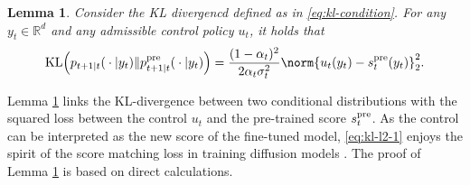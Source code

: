 \documentclass{article}
\newtheorem{Lemma}[Theorem]{Lemma}
\newcommand{\R}{\mathbb{R}}
\begin{document}
%
  \begin{Lemma} \label{lemma:kl-l2} 
  Consider the KL divergencd defined as in \eqref{eq:kl-condition}.
  For any $y_t \in \R^d$ and any admissible control policy $u_t$, it holds that
      \begin{align}\label{eq:kl-l2-1}
        {\rm KL}\Big(p_{t+1\vert t}({}\cdot{}\vert y_t) \|p_{t+1\vert t}^{\rm pre}({}\cdot{}\vert y_t)\Big) = \frac{(1 - \alpha_{t})^{2}}{2\alpha_{t}\sigma_{t}^{2}}\norm{u_{t}(y_t) - s^{\rm pre}_{t}(y_{t})}_{2}^{2}.
    \end{align}
  \end{Lemma}
    
  Lemma \ref{lemma:kl-l2} links the KL-divergence between two conditional distributions with the squared loss between the control $u_t$ and the pre-trained score $s_t^{\rm pre}$. As the control can be interpreted as the new score of the fine-tuned model, \eqref{eq:kl-l2-1} enjoys the spirit of the score matching loss in training diffusion models \cite{Ho20,song2020score,han2024neural}. The proof of Lemma \ref{lemma:kl-l2} is based on direct calculations.
\end{document}
